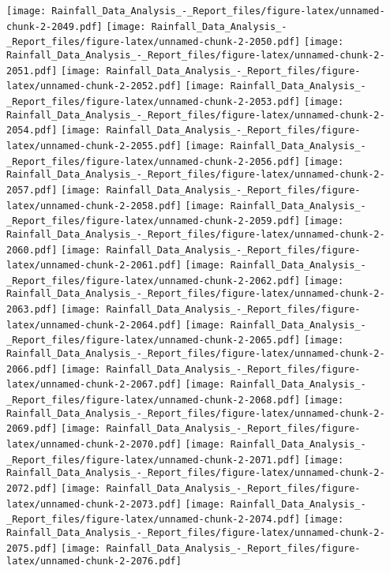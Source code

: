 \documentclass[
]{article}
\begin{document}
\texttt{[image: Rainfall\_Data\_Analysis\_-\_Report\_files/figure-latex/unnamed-chunk-2-2049.pdf]}
\texttt{[image: Rainfall\_Data\_Analysis\_-\_Report\_files/figure-latex/unnamed-chunk-2-2050.pdf]}
\texttt{[image: Rainfall\_Data\_Analysis\_-\_Report\_files/figure-latex/unnamed-chunk-2-2051.pdf]}
\texttt{[image: Rainfall\_Data\_Analysis\_-\_Report\_files/figure-latex/unnamed-chunk-2-2052.pdf]}
\texttt{[image: Rainfall\_Data\_Analysis\_-\_Report\_files/figure-latex/unnamed-chunk-2-2053.pdf]}
\texttt{[image: Rainfall\_Data\_Analysis\_-\_Report\_files/figure-latex/unnamed-chunk-2-2054.pdf]}
\texttt{[image: Rainfall\_Data\_Analysis\_-\_Report\_files/figure-latex/unnamed-chunk-2-2055.pdf]}
\texttt{[image: Rainfall\_Data\_Analysis\_-\_Report\_files/figure-latex/unnamed-chunk-2-2056.pdf]}
\texttt{[image: Rainfall\_Data\_Analysis\_-\_Report\_files/figure-latex/unnamed-chunk-2-2057.pdf]}
\texttt{[image: Rainfall\_Data\_Analysis\_-\_Report\_files/figure-latex/unnamed-chunk-2-2058.pdf]}
\texttt{[image: Rainfall\_Data\_Analysis\_-\_Report\_files/figure-latex/unnamed-chunk-2-2059.pdf]}
\texttt{[image: Rainfall\_Data\_Analysis\_-\_Report\_files/figure-latex/unnamed-chunk-2-2060.pdf]}
\texttt{[image: Rainfall\_Data\_Analysis\_-\_Report\_files/figure-latex/unnamed-chunk-2-2061.pdf]}
\texttt{[image: Rainfall\_Data\_Analysis\_-\_Report\_files/figure-latex/unnamed-chunk-2-2062.pdf]}
\texttt{[image: Rainfall\_Data\_Analysis\_-\_Report\_files/figure-latex/unnamed-chunk-2-2063.pdf]}
\texttt{[image: Rainfall\_Data\_Analysis\_-\_Report\_files/figure-latex/unnamed-chunk-2-2064.pdf]}
\texttt{[image: Rainfall\_Data\_Analysis\_-\_Report\_files/figure-latex/unnamed-chunk-2-2065.pdf]}
\texttt{[image: Rainfall\_Data\_Analysis\_-\_Report\_files/figure-latex/unnamed-chunk-2-2066.pdf]}
\texttt{[image: Rainfall\_Data\_Analysis\_-\_Report\_files/figure-latex/unnamed-chunk-2-2067.pdf]}
\texttt{[image: Rainfall\_Data\_Analysis\_-\_Report\_files/figure-latex/unnamed-chunk-2-2068.pdf]}
\texttt{[image: Rainfall\_Data\_Analysis\_-\_Report\_files/figure-latex/unnamed-chunk-2-2069.pdf]}
\texttt{[image: Rainfall\_Data\_Analysis\_-\_Report\_files/figure-latex/unnamed-chunk-2-2070.pdf]}
\texttt{[image: Rainfall\_Data\_Analysis\_-\_Report\_files/figure-latex/unnamed-chunk-2-2071.pdf]}
\texttt{[image: Rainfall\_Data\_Analysis\_-\_Report\_files/figure-latex/unnamed-chunk-2-2072.pdf]}
\texttt{[image: Rainfall\_Data\_Analysis\_-\_Report\_files/figure-latex/unnamed-chunk-2-2073.pdf]}
\texttt{[image: Rainfall\_Data\_Analysis\_-\_Report\_files/figure-latex/unnamed-chunk-2-2074.pdf]}
\texttt{[image: Rainfall\_Data\_Analysis\_-\_Report\_files/figure-latex/unnamed-chunk-2-2075.pdf]}
\texttt{[image: Rainfall\_Data\_Analysis\_-\_Report\_files/figure-latex/unnamed-chunk-2-2076.pdf]}
\end{document}
